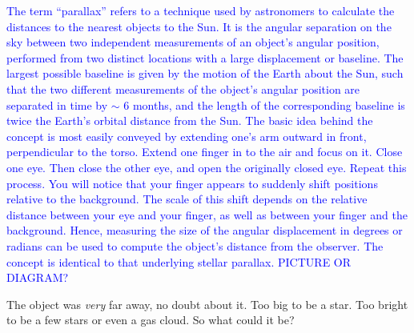 \documentclass[main.tex]{subfiles}
\begin{document}
\begin{tcolorbox}[sharp corners, colback=blue!30, colframe=blue!80!blue, title=Parallax]
\par \textcolor{blue} {The term ``parallax'' refers to a technique used by astronomers to calculate the distances to the nearest objects to the Sun.  It is the angular separation on the sky between two independent measurements of an object's angular position, performed from two distinct locations with a large displacement or baseline.  The largest possible baseline is given by the motion of the Earth about the Sun, such that the two different measurements of the object's angular position are separated in time by $\sim$ 6 months, and the length of the corresponding baseline is twice the Earth's orbital distance from the Sun.  The basic idea behind the concept is most easily conveyed by extending one's arm outward in front, perpendicular to the torso.  Extend one finger in to the air and focus on it.  Close one eye.  Then close the other eye, and open the originally closed eye.  Repeat this process.  You will notice that your finger appears to suddenly shift positions relative to the background.  The scale of this shift depends on the relative distance between your eye and your finger, as well as between your finger and the background.  Hence, measuring the size of the angular displacement in degrees or radians can be used to compute the object's distance from the observer.  The concept is identical to that underlying stellar parallax. PICTURE OR DIAGRAM?} 
\end{tcolorbox} 


\par \nar The object was \textit{very} far away, no doubt about it.  Too big to be a star.  Too bright to be a few stars or even a gas cloud.  So what could it be? 
\end{document}
